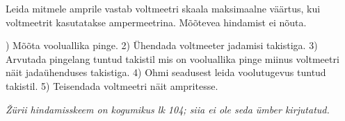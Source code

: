 
Leida mitmele amprile vastab voltmeetri skaala maksimaalne väärtus, kui voltmeetrit kasutatakse ampermeetrina. Mõõtevea hindamist ei nõuta.

\hint

) Mõõta vooluallika pinge. 2) Ühendada voltmeeter jadamisi takistiga. 3) Arvutada pingelang tuntud takistil mis on vooluallika pinge miinus voltmeetri näit jadaühenduses takistiga. 4) Ohmi seadusest leida voolutugevus tuntud takistil. 5) Teisendada voltmeetri näit ampritesse.

\textit{Žürii hindamisskeem on kogumikus lk 104; siia ei ole seda ümber kirjutatud.}
\probend
